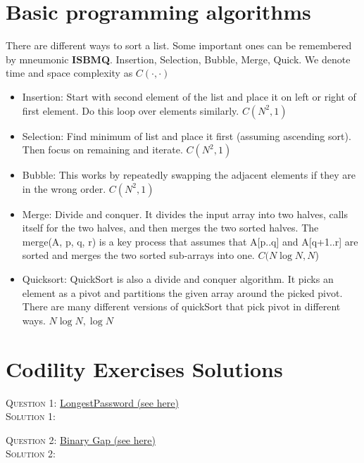 \documentclass[11pt]{article}
\begin{document}
\section{Basic programming algorithms}

There are different ways to sort a list. Some important ones can be remembered by mneumonic \textbf{ISBMQ}. 
Insertion, Selection, Bubble, Merge, Quick. We denote time and space complexity as $C(\cdot, \cdot)$

\begin{itemize} 
\item Insertion: Start with second element of the list and place it on left or right of first element. Do this loop over elements similarly.  $C(N^2, 1)$
\item Selection: Find minimum of list and place it first (assuming ascending sort). Then focus on remaining and iterate.   $C(N^2, 1)$
\item Bubble: This works by repeatedly swapping the adjacent elements if they are in the wrong order.  $C(N^2, 1)$
\item Merge: Divide and conquer. It divides the input array into two halves, calls itself for the two halves, and then merges the two sorted halves.  The merge(A, p, q, r) is a key process that assumes that A[p..q] and A[q+1..r] are sorted and merges the two sorted sub-arrays into one. $C(N \log N, N$)
\item Quicksort: QuickSort is also a divide and conquer algorithm. It picks an element as a pivot and partitions the given array around the picked pivot. There are many different versions of quickSort that pick pivot in different ways. $N \log N, \log N$
\end{itemize} 



\section{Codility Exercises Solutions}

\textsc{Question 1:} \href{https://app.codility.com/programmers/trainings/1/longest_password/}{LongestPassword (see here)} \\
\textsc{Solution 1:} 


\begin{mdframed}[backgroundcolor=celadon!6]

\end{mdframed}

\textsc{Question 2:} \href{https://app.codility.com/programmers/lessons/1-iterations/binary_gap/}{Binary Gap (see here)} \\
\textsc{Solution 2:} 
\end{document}
